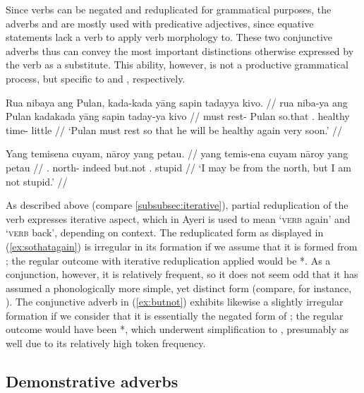 Since verbs can be negated and reduplicated for grammatical purposes, the
adverbs  and  are mostly used with predicative adjectives, since equative statements
lack a verb to apply verb morphology to. These two conjunctive adverbs thus can
convey the most important distinctions otherwise expressed by the verb as a
substitute. This ability, however, is not a productive grammatical process, but
specific to  and , respectively.

\pex
\a\label{ex:sothatagain}\begingl
	\gla Rua nibaya ang Pulan, kada-kada yāng sapin tadayya kivo. //
	\glb rua niba-ya ang Pulan kada\til{}kada yāng sapin taday-ya kivo //
	\glc must rest-\TsgM{} \Aarg{} Pulan \Iter{}\til{}so.that 
		\TsgM{}.\Aarg{} healthy time-\Loc{} little //
	\glft `Pulan must rest so that he will be healthy again very soon.' //
\endgl

\a\label{ex:butnot}\begingl
	\gla Yang temisena cuyam, nāroy yang petau. //
	\glb yang temis-ena cuyam nāroy yang petau //
	\glc \Fsg{}.\Aarg{} north-\Gen{} indeed but.not \Fsg{}.\Aarg{} stupid //
	\glft `I may be from the north, but I am not stupid.' //
\endgl

\xe

As described above (compare \autoref{subsubsec:iterative}), partial
reduplication of the verb expresses iterative aspect, which in Ayeri is used
to mean `\textsc{verb} again' and `\textsc{verb} back', depending on context.
The reduplicated form  as displayed in
(\ref{ex:sothatagain}) is irregular in its formation if we assume that it is
formed from ; the regular outcome with
iterative reduplication applied would be *. As a
conjunction, however, it is relatively frequent, so it does not seem odd that
it has assumed a phonologically more  simple, yet distinct form (compare, for
instance,  \cite[11--12]{bybeehopper2001b}). The conjunctive adverb in
(\ref{ex:butnot}) exhibits likewise a slightly irregular formation if we
consider that it is essentially the negated form of ;
the regular outcome would have been *, which underwent
simplification to , presumably as well due to its
relatively high token frequency.


\subsection{Demonstrative adverbs}

